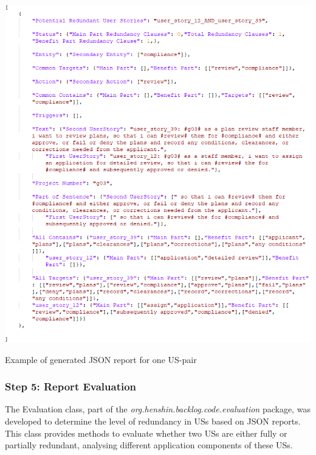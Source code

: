 \begin{MyListing}
	
	\centering
	\includegraphics[scale=0.7]{Listing/JSONReportSample.png}
	\caption{Example of generated JSON report for one US-pair}\label{list:json_report_sample}
	
\end{MyListing}	
\subsubsection*{Step 5: Report Evaluation}
The Evaluation class, part of the \textit{org.henshin.backlog.code.evaluation} package, was developed to determine the level of redundancy in USs based on JSON reports. This class provides methods to evaluate whether two USs are either fully or partially redundant, analysing different application components of these USs.

